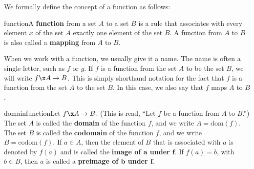 We formally define the concept of a function as follows:
%
\begin{defbox}{function}{A \textbf{function}
%
 from a set  $A$  to a set  $B$  is a rule that associates with every element  $x$  of the set  $A$  exactly one element of the set  $B$.  A function from  $A$  to  $B$ is also called a 
\textbf{mapping}
%
 from  $A$  to  $B$.}
\end{defbox}
%
When we work with a function, we usually give it a name.  The name is often a single letter, such as  $f$  or  $g$.  If  $f$  is a function from the set  $A$  to be the set  $B$, we will write  $f\x A \to B$.
\label{sym:function}%
  This is simply shorthand notation for the fact that  $f$  is a function from the set  $A$  to the set  $B$.  In this case, we also say that  $f$  maps  $A$  to  $B$.
%
%
\begin{defbox}{domainfunction}{Let  $f\x A \to B$.  (This is read, ``Let  $f$  be a function from  $A$  to  $B$.'')  The set  $A$  is called the \textbf{domain}
%
%
of the function  $f$, and we write  $A = \text{dom}( f )$\!.\label{sym:domfunc}  The set  $B$ is called the \textbf{codomain}
%
%
of the function  $f$, and we write  $B = \text{codom}( f )$\!. \label{sym:codomain}
\vskip6pt
If  $a \in A$, then the element of  $B$  that is associated with  $a$  is denoted by  
$f( a )$ 
\label{sym:fofx}and is called the \textbf{image of  $\boldsymbol{a}$
%
  under  $\boldsymbol{f}$}\!.  If  $f( a ) = b$, with  $b \in B$, then  $a$  is called a 
\textbf{preimage of  $\boldsymbol{b}$
%
  under  $\boldsymbol{f}$}\!.}  
\end{defbox}

